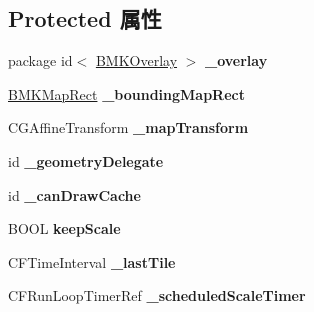 \subsection*{Protected 属性}
\begin{DoxyCompactItemize}
\item 
\hypertarget{interface_b_m_k_overlay_view_a1221418aafb1e98ab9caf88bb5fea5d7}{}package id$<$ \hyperlink{protocol_b_m_k_overlay-p}{B\+M\+K\+Overlay} $>$ {\bfseries \+\_\+overlay}\label{interface_b_m_k_overlay_view_a1221418aafb1e98ab9caf88bb5fea5d7}

\item 
\hypertarget{interface_b_m_k_overlay_view_a9c358f158a9d30b23ff8dddce028be61}{}\hyperlink{struct_b_m_k_map_rect}{B\+M\+K\+Map\+Rect} {\bfseries \+\_\+bounding\+Map\+Rect}\label{interface_b_m_k_overlay_view_a9c358f158a9d30b23ff8dddce028be61}

\item 
\hypertarget{interface_b_m_k_overlay_view_a33718c9269f4aad056f2360a368d65bb}{}C\+G\+Affine\+Transform {\bfseries \+\_\+map\+Transform}\label{interface_b_m_k_overlay_view_a33718c9269f4aad056f2360a368d65bb}

\item 
\hypertarget{interface_b_m_k_overlay_view_a811bdb8cdb5c83a3e91674eeb35db281}{}id {\bfseries \+\_\+geometry\+Delegate}\label{interface_b_m_k_overlay_view_a811bdb8cdb5c83a3e91674eeb35db281}

\item 
\hypertarget{interface_b_m_k_overlay_view_af3de42334db2d56dfe7b9c2674fcd6a2}{}id {\bfseries \+\_\+can\+Draw\+Cache}\label{interface_b_m_k_overlay_view_af3de42334db2d56dfe7b9c2674fcd6a2}

\item 
\hypertarget{interface_b_m_k_overlay_view_a4f7d62b7dfdc4502a2b95c678e4e0190}{}B\+O\+O\+L {\bfseries keep\+Scale}\label{interface_b_m_k_overlay_view_a4f7d62b7dfdc4502a2b95c678e4e0190}

\item 
\hypertarget{interface_b_m_k_overlay_view_ae28114032fc8056e491f11c6e41d9bda}{}C\+F\+Time\+Interval {\bfseries \+\_\+last\+Tile}\label{interface_b_m_k_overlay_view_ae28114032fc8056e491f11c6e41d9bda}

\item 
\hypertarget{interface_b_m_k_overlay_view_ae9feb5df6871e3e2cbc3ddd3fcfcefdc}{}C\+F\+Run\+Loop\+Timer\+Ref {\bfseries \+\_\+scheduled\+Scale\+Timer}\label{interface_b_m_k_overlay_view_ae9feb5df6871e3e2cbc3ddd3fcfcefdc}


\end{DoxyCompactItemize}
